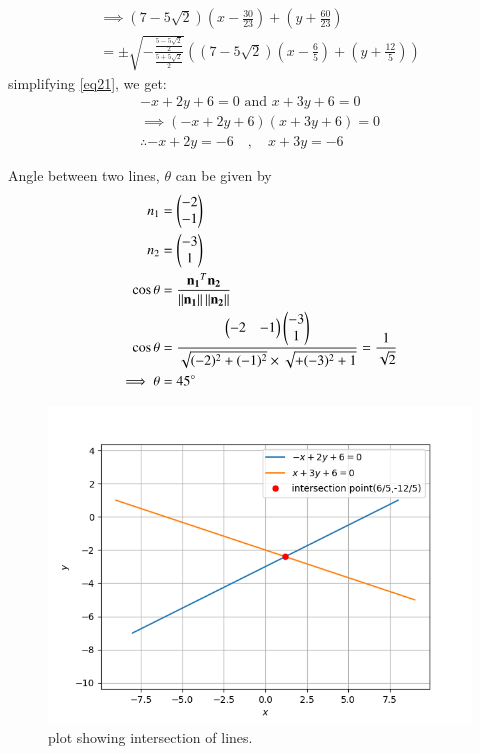 \documentclass[journal,12pt,twocolumn]{IEEEtran}
\begin{document}
\begin{multline}\label{eq21}
\implies	\left(7-5 \sqrt{2}\right)\left(x-\frac{30}{23}\right) + \left(y+\frac{60}{23}\right) \\= \pm \sqrt{-\frac{\frac{5-5\sqrt{2}}{2}}{\frac{5+5\sqrt{2}}{2}}}\left(\left(7-5 \sqrt{2}\right)\left(x-\frac{6}{5}\right) + \left(y+\frac{12}{5}\right)\right)
\end{multline}
simplifying \ref{eq21}, we get:
\begin{align}
	\label{eq22}-x + 2y + 6 = 0 \text{ and } x + 3y + 6 = 0\\
	\implies (-x + 2y + 6)(x + 3y + 6) = 0\\
	\therefore -x+2y=-6 \quad , \quad x+3y=-6\label{eq23}
\end{align}


Angle between two lines, $\theta$ can be given by
\begin{align}
n_1&=\begin{pmatrix}-2\\-1\end{pmatrix}\\
n_2&=\begin{pmatrix}-3\\1\end{pmatrix}\\
\cos \theta &= \frac{\mathbf{n_1}^T\mathbf{n_2}}{\left\lVert\mathbf{n_1}\right\rVert\left\lVert\mathbf{n_2}\right\rVert}\\
\cos \theta&=\frac{\begin{pmatrix}-2&-1\end{pmatrix}\begin{pmatrix}-3\\1\end{pmatrix}}{\sqrt{(-2)^2 +(-1)^2} \times \sqrt{+(-3)^2+1}}=\frac{1}{\sqrt{2}}\\
\implies \theta &= 45\degree
\end{align}
\begin{figure}[!h]
\centering
\includegraphics[width=\columnwidth]{Figure_1.png}
\caption{plot showing intersection of lines.}
\label{Fig_1}
\end{figure}
\end{document}
